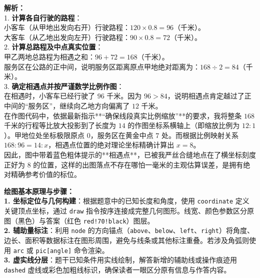 \vspace{0.6cm}
{\small\color{gray}
\textbf{解析：}\\
1. \textbf{计算各自行驶的路程}：\\
\indent 小客车（从甲地出发向右开）行驶路程：$120 \times 0.8 = 96$（千米）。\\
\indent 大客车（从乙地出发向左开）行驶路程：$90 \times 0.8 = 72$（千米）。\\
2. \textbf{计算总路程及中点真实位置}：\\
\indent 甲乙两地总路程为相遇之和：$96 + 72 = 168$（千米）。\\
\indent 服务区在公路的正中间，说明服务区距离原点甲地绝对距离为：$168 \div 2 = 84$（千米）。\\
3. \textbf{确定相遇点并按严谨数学比例作图}：\\
\indent 在相遇时，小客车已经行驶了 $96$ 千米。因为 $96 > 84$，说明相遇点肯定越过了正中间的“服务区”，继续向乙地方向偏离了 $12$ 千米。\\
\indent 在作图代码中，依据最新指示**“确保线段真实比例缩放”**的要求，我将整条 $168$ 千米的行程等比放大投影到了长度为 $14$ 的作图坐标系横轴上（即缩放比例为 $12:1$）。甲地位处坐标极限原点 $0$，服务区在黄金中点 $7$ 处。而根据比例映射关系 $168 : 96 = 14 : x$，相遇点位置的绝对理论坐标精确计算出 $x = 8$。\\
\indent 因此，图中带着蓝色粗体提示的**相遇点**，已被我严丝合缝地点在了横坐标刻度正好为 $8$ 的位置，这样的出图落点不存在哪怕一毫米的主观估算误差，是拥有绝对精确参考价值的标位。
}


\vspace{0.6cm}

{\small\color{blue!70!black}
\textbf{绘图基本原理与步骤：}\\
\textbf{1. 坐标定位与几何构建}：根据题意中的已知长度和角度，使用 \texttt{coordinate} 定义关键顶点坐标，通过 \texttt{draw} 指令按序连接成完整几何图形。线宽、颜色参数区分原图（黑色）与答案（红色 \texttt{red!70!black}）图层。\\
\textbf{2. 辅助量标注}：利用 \texttt{node} 的方向锚点（\texttt{above}、\texttt{below}、\texttt{left}、\texttt{right}）将角度、边长、面积等数据标注在图形周围，避免与线条或其他标注重叠。若涉及角弧则使用 \texttt{arc} 或 \texttt{pic[angle]} 命令渲染。\\
\textbf{3. 虚实线分层}：题干已知条件用实线绘制，解答新增的辅助线或操作痕迹用 \texttt{dashed} 虚线或彩色加粗线标识，确保读者一眼区分原有信息与作答内容。
}




